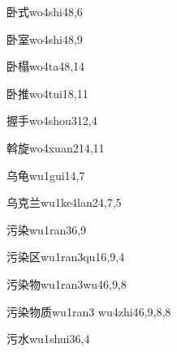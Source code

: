 \begin{entry}{卧式}{wo4shi4}{8,6}
\end{entry}

\begin{entry}{卧室}{wo4shi4}{8,9}
\end{entry}

\begin{entry}{卧榻}{wo4ta4}{8,14}
\end{entry}

\begin{entry}{卧推}{wo4tui1}{8,11}
\end{entry}

\begin{entry}{握手}{wo4shou3}{12,4}
\end{entry}

\begin{entry}{斡旋}{wo4xuan2}{14,11}
\end{entry}

\begin{entry}{乌龟}{wu1gui1}{4,7}
\end{entry}

\begin{entry}{乌克兰}{wu1ke4lan2}{4,7,5}
\end{entry}

\begin{entry}{污染}{wu1ran3}{6,9}
\end{entry}

\begin{entry}{污染区}{wu1ran3qu1}{6,9,4}
\end{entry}

\begin{entry}{污染物}{wu1ran3wu4}{6,9,8}
\end{entry}

\begin{entry}{污染物质}{wu1ran3 wu4zhi4}{6,9,8,8}
\end{entry}

\begin{entry}{污水}{wu1shui3}{6,4}
\end{entry}

